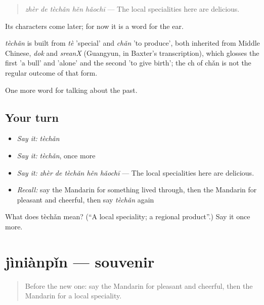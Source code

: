 \begin{quote}
\emph{zhèr de tèchǎn hěn hǎochī} — The local specialities here are delicious.
\end{quote}

Its characters come later; for now it is a word for the ear.

\begin{cousinweb}
\emph{tèchǎn} is built from \emph{tè} 'special' and \emph{chǎn} 'to produce', both inherited from Middle Chinese, \emph{dok} and \emph{sreanX} (Guangyun, in Baxter's transcription), which glosses the first 'a bull' and 'alone' and the second 'to give birth'; the ch of chǎn is not the regular outcome of that form.
\end{cousinweb}

\begin{grammarlens}[title={What you've built}]
One more word for talking about the past.
\end{grammarlens}

\subsection*{Your turn}
\begin{itemize}
\raggedright
  \item \emph{Say it:} \emph{tèchǎn}
  \item \emph{Say it:} \emph{tèchǎn}, once more
  \item \emph{Say it:} \emph{zhèr de tèchǎn hěn hǎochī} — The local specialities here are delicious.
  \item \emph{Recall:} say the Mandarin for something lived through, then the Mandarin for pleasant and cheerful, then say \emph{tèchǎn} again
\end{itemize}

\begin{tcolorbox}[breakable,colback=teal!4,colframe=teal!35!black,title={Before you move on}]
What does tèchǎn mean? (\textquotedblleft{}A local speciality; a regional product\textquotedblright{}.) Say it once more.
\end{tcolorbox}
\section[jìniànpǐn]{jìniànpǐn — souvenir}

\label{lesson:ZH-C247-jinianpin}



\begin{quote}
Before the new one: say the Mandarin for pleasant and cheerful, then the Mandarin for a local speciality.
\end{quote}

